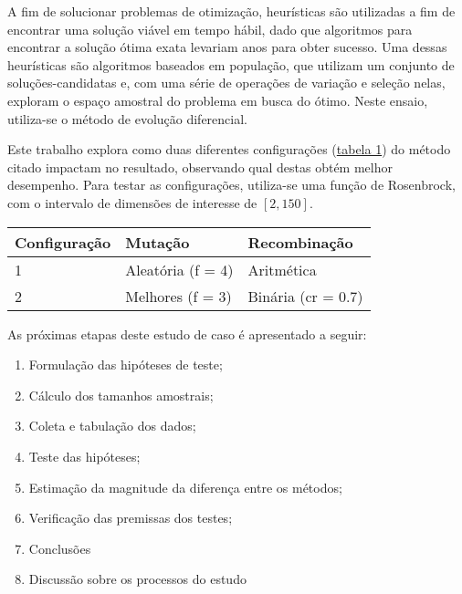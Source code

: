 \documentclass[
]{article}
\author{}
\date{\vspace{-2.5em}}
\providecommand{\tightlist}{%
  \setlength{\itemsep}{0pt}\setlength{\parskip}{0pt}}
\begin{document}
A fim de solucionar problemas de otimização, heurísticas são utilizadas
a fim de encontrar uma solução viável em tempo hábil, dado que
algoritmos para encontrar a solução ótima exata levariam anos para obter
sucesso. Uma dessas heurísticas são algoritmos baseados em população,
que utilizam um conjunto de soluções-candidatas e, com uma série de
operações de variação e seleção nelas, exploram o espaço amostral do
problema em busca do ótimo. Neste ensaio, utiliza-se o método de
evolução diferencial.

Este trabalho explora como duas diferentes configurações
(\protect\hyperlink{tabel1}{tabela 1}) do método citado impactam no
resultado, observando qual destas obtém melhor desempenho. Para testar
as configurações, utiliza-se uma função de Rosenbrock, com o intervalo
de dimensões de interesse de \([2,150]\).

\begin{longtable}[]{@{}lll@{}}
\toprule
Configuração & Mutação & Recombinação\tabularnewline
\midrule
\endhead
1 & Aleatória (f = 4) & Aritmética\tabularnewline
2 & Melhores (f = 3) & Binária (cr = 0.7)\tabularnewline
\bottomrule
\end{longtable}

As próximas etapas deste estudo de caso é apresentado a seguir:

\begin{enumerate}
\def\labelenumi{\arabic{enumi}.}
\tightlist
\item
  Formulação das hipóteses de teste;
\item
  Cálculo dos tamanhos amostrais;
\item
  Coleta e tabulação dos dados;
\item
  Teste das hipóteses;
\item
  Estimação da magnitude da diferença entre os métodos;
\item
  Verificação das premissas dos testes;
\item
  Conclusões
\item
  Discussão sobre os processos do estudo
\end{enumerate}
\end{document}
